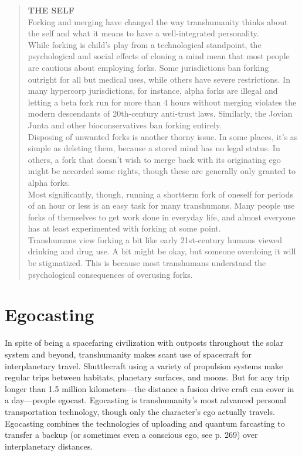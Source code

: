 \begin{quotation} \textbf{THE SELF} \\ Forking and merging have changed the way transhumanity thinks about the self and what it means to have a well-integrated personality. \\ While forking is child’s play from a technological standpoint, the psychological and social effects of cloning a mind mean that most people are cautious about employing forks. Some jurisdictions ban forking outright for all but medical uses, while others have severe restrictions. In many hypercorp jurisdictions, for instance, alpha forks are illegal and letting a beta fork run for more than 4 hours without merging violates the modern descendants of 20th-century anti-trust laws. Similarly, the Jovian Junta and other bioconservatives ban forking entirely. \\ Disposing of unwanted forks is another thorny issue. In some places, it’s as simple as deleting them, because a stored mind has no legal status. In others, a fork that doesn’t wish to merge back with its originating ego might be accorded some rights, though these are generally only granted to alpha forks. \\ Most significantly, though, running a shortterm fork of oneself for periods of an hour or less is an easy task for many transhumans. Many people use forks of themselves to get work done in everyday life, and almost everyone has at least experimented with forking at some point. \\ Transhumans view forking a bit like early 21st-century humans viewed drinking and drug use. A bit might be okay, but someone overdoing it will be stigmatized. This is because most transhumans understand the psychological consequences of overusing forks. \end{quotation} 

\section{Egocasting} 

In spite of being a spacefaring civilization with outposts throughout the solar system and beyond, transhumanity makes scant use of spacecraft for interplanetary travel. Shuttlecraft using a variety of propulsion systems make regular trips between habitats, planetary surfaces, and moons. But for any trip longer than 1.5 million kilometers—the distance a fusion drive craft can cover in a day—people egocast. Egocasting is transhumanity's most advanced personal transportation technology, though only the character's ego actually travels. Egocasting combines the technologies of uploading and quantum farcasting to transfer a backup (or sometimes even a conscious ego, see p. 269) over interplanetary distances. 



